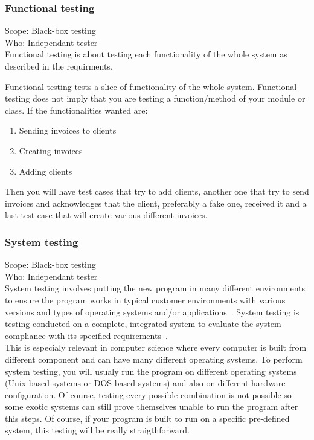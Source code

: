 \documentclass[12pt]{article}
\begin{document}
\subsubsection{Functional testing}

Scope: Black-box testing\\
Who: Independant tester\\

Functional testing is about testing each functionality of the whole system as described in the requirments.

Functional testing tests a slice of functionality of the whole system. Functional testing does not imply that you are testing a function/method of your module or class. If the functionalities wanted are:
\begin{enumerate}
\item Sending invoices to clients
\item Creating invoices
\item Adding clients
\end{enumerate}

Then you will have test cases that try to add clients, another one that try to send invoices and acknowledges that the client, preferably a fake one, received it and a last test case that will create various different invoices.

\subsubsection{System testing}

Scope: Black-box testing\\
Who: Independant tester\\

System testing involves putting the new program in many different environments to ensure the program works in typical customer environments with various versions and types of operating systems and/or applications~\cite{Laurie.W:Black-box}. System testing is testing conducted on a complete, integrated system to evaluate the
system compliance with its specified requirements~\cite{IEEEStd1990}.\\

This is especialy relevant in computer science where every computer is built from different component and can have many different operating systems. To perform system testing, you will usualy run the program on different operating systems (Unix based systems or DOS based systems) and also on different hardware configuration. Of course, testing every possible combination is not possible so some exotic systems can still prove themselves unable to run the program after this steps. Of course, if your program is built to run on a specific pre-defined system, this testing will be really straigthforward.
\end{document}
